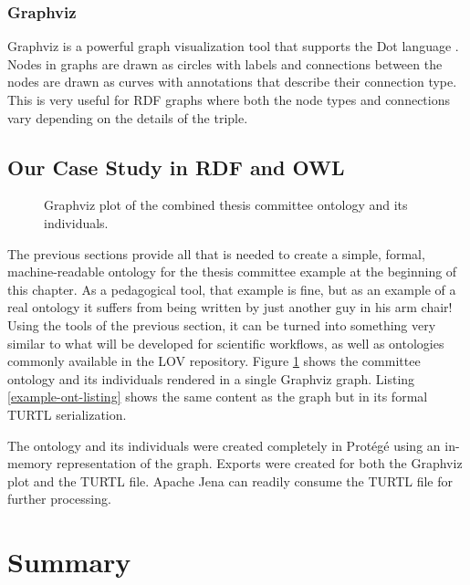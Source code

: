 \subsubsection{Graphviz}

Graphviz is a powerful graph visualization tool that supports the Dot language
\cite{noauthor_graphviz_nodate}. Nodes in graphs are drawn as circles with
labels and connections between the nodes are drawn as curves with annotations
that describe their connection type. This is very useful for RDF graphs where
both the node types and connections vary depending on the details of the triple.

\subsection{Our Case Study in RDF and OWL}

\begin{figure}[htbp]
\centering
{}
\caption{Graphviz plot of the combined thesis committee ontology and its
individuals.}
\label{example-ont-graphic}
\end{figure}

The previous sections provide all that is needed to create a simple,
formal, machine-readable ontology for the thesis committee example at the
beginning of this chapter. As a pedagogical tool, that example is fine, but as
an example of a real ontology it suffers from being written by just another guy
in his arm chair! Using the tools of the previous section, it can be turned
into something very similar to what will be developed for scientific workflows,
as well as ontologies commonly available in the LOV
repository. Figure \ref{example-ont-graphic} shows the committee ontology and
its individuals rendered in a single Graphviz graph. Listing
\ref{example-ont-listing} shows the same content as the graph but in its
formal TURTL serialization.



The ontology and its individuals were created completely in Prot\'eg\'e using an
in-memory representation of the graph. Exports were created for both the
Graphviz plot and the TURTL file. Apache Jena can readily consume the TURTL file
for further processing.

\section{Summary}

